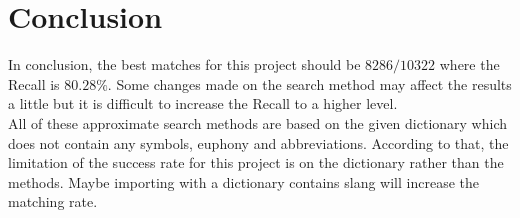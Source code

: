 \documentclass[11pt]{article}
\begin{document}
\section{Conclusion} 
In conclusion, the best matches for this project should be $8286 / 10322$ where the Recall is $80.28\%$. Some changes made on the search method may affect the results a little but it is difficult to increase the Recall to a higher level.
\\All of these approximate search methods are based on the given dictionary which does not contain any symbols, euphony and abbreviations. According to that, the limitation of the success rate for this project is on the dictionary rather than the methods.
Maybe importing with a dictionary contains slang will increase the matching rate.



\end{document}
